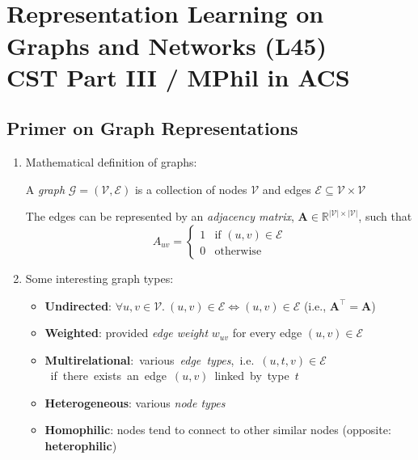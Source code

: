 \documentclass{article}
\author{Victor Zhao\\xz398@cam.ac.uk}
\begin{document}
\centering
\section*{\vspace*{-2\baselineskip}\\Representation Learning on Graphs and Networks (L45)\\CST Part III / MPhil in ACS}
\MyAuthor

\justifying

\subsection{Primer on Graph Representations}

\begin{enumerate}
	\item Mathematical definition of graphs: 
	
	A \textit{graph} $\mathcal{G}=(\mathcal{V}, \mathcal{E})$ is a collection of nodes $\mathcal{V}$ and edges $\mathcal{E}\subseteq\mathcal{V}\times\mathcal{V}$
	
	The edges can be represented by an \textit{adjacency matrix}, $\mathbf{A}\in\mathbb{R}^{|\mathcal{V}|\times|\mathcal{V}|}$, such that
	\vspace*{-0.5\baselineskip}
	$$A_{uv}=\begin{cases}
		1 &\text{if }(u,v)\in\mathcal{E}\\
		0 &\text{otherwise}
	\end{cases}$$

	\item \vspace*{-\baselineskip}Some interesting graph types:
	\begin{itemize}[topsep=0pt]
		\item \textbf{Undirected}: $\forall u, v\in\mathcal{V}.\ (u,v)\in\mathcal{E}\Longleftrightarrow (u,v)\in\mathcal{E}$ (i.e., $\mathbf{A}^\top=\mathbf{A}$)
		\item \textbf{Weighted}: provided \textit{edge weight} $w_{uv}$ for every edge $(u,v)\in\mathcal{E}$
		\item \textbf{Multirelational}:~various~\textit{edge~types},~i.e.~$(u,t,v)\in\mathcal{E}$~if~there~exists~an~edge~$(u,v)$~linked~by~type~$t$
		\item \textbf{Heterogeneous}: various \textit{node types}
		\item \textbf{Homophilic}: nodes tend to connect to other similar nodes (opposite: \textbf{heterophilic})
	\end{itemize}


\end{enumerate}
\end{document}
